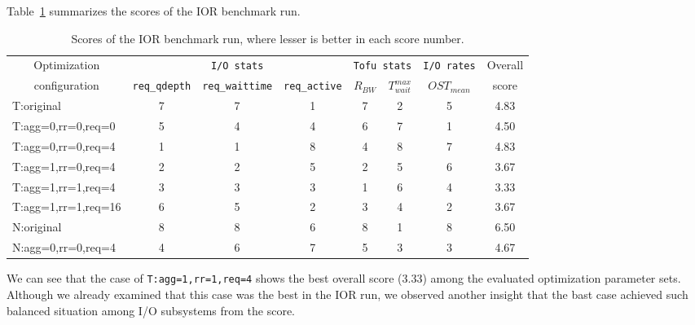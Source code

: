 \documentclass{jhps}
\begin{document}
Table~\ref{tbl:IOR_OVERALL_EVAL} summarizes the scores of the IOR benchmark run.
%
\begin{table}[tb]
\caption{Scores of the IOR benchmark run, where lesser is better in each score number.}
\centering
\begin{tabular}{lccccccc}
\hline
\multicolumn{1}{c}{Optimization}  & \multicolumn{3}{c}{{\tt I/O stats}} & \multicolumn{2}{c}{{\tt Tofu stats}} & {\tt I/O rates} & Overall \\
\multicolumn{1}{c}{configuration} & {\tt req\_qdepth} & {\tt req\_waittime} & {\tt req\_active} &  $R_{BW}$ & $T_{wait}^{max}$ & $OST_{mean}$ & score \\
\hline
T:original      	& 7 & 7 & 1 & 7 & 2 & 5 & 4.83 \\
T:agg=0,rr=0,req=0  & 5 & 4 & 4 & 6 & 7 & 1 & 4.50 \\
T:agg=0,rr=0,req=4  & 1 & 1 & 8 & 4 & 8 & 7 & 4.83 \\
T:agg=1,rr=0,req=4  & 2 & 2 & 5 & 2 & 5 & 6 & 3.67 \\
T:agg=1,rr=1,req=4  & 3 & 3 & 3 & 1 & 6 & 4 & 3.33 \\
T:agg=1,rr=1,req=16 & 6 & 5 & 2 & 3 & 4 & 2 & 3.67 \\
N:original      	& 8 & 8 & 6 & 8 & 1 & 8 & 6.50 \\
N:agg=0,rr=0,req=4  & 4 & 6 & 7 & 5 & 3 & 3 & 4.67 \\
\hline
\end{tabular}
\label{tbl:IOR_OVERALL_EVAL}
\end{table}
%
We can see that the case of {\tt T:agg=1,rr=1,req=4} shows
the best overall score (3.33) among the evaluated optimization parameter sets.
Although we already examined that this case was the best in the IOR run,
we observed another insight that the bast case achieved such balanced situation
among I/O subsystems from the score.
\end{document}
